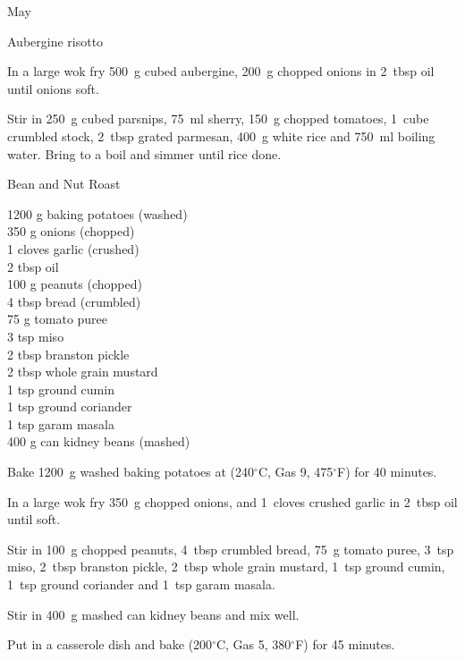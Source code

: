 \begin{menu}{May}
\begin{recipe}{2}{Aubergine risotto}
\begin{ingredients}
		\end{ingredients}
	
    \begin{instructions}
    \item 
        In a large wok fry
        500~g cubed aubergine,
        200~g chopped onions
        in
        2~tbsp  oil
        until onions soft.
      \item 
        Stir in
        250~g cubed parsnips,
        75~ml  sherry,
        150~g chopped tomatoes,
        1~cube crumbled stock,
        2~tbsp grated parmesan,
        400~g  white rice
        and
        750~ml  boiling water.
        Bring to a boil and simmer until rice done.
      
    \end{instructions}
    \end{recipe}%
  
    \begin{recipe}{2}{Bean and Nut Roast}%
		\begin{ingredients}
		1200 g baking potatoes (washed) \\
	350 g onions (chopped) \\
	1 cloves garlic (crushed) \\
	2 tbsp oil  \\
	100 g peanuts (chopped) \\
	4 tbsp bread (crumbled) \\
	75 g tomato puree  \\
	3 tsp miso  \\
	2 tbsp branston pickle  \\
	2 tbsp whole grain mustard  \\
	1 tsp ground cumin  \\
	1 tsp ground coriander  \\
	1 tsp garam masala  \\
	400 g can kidney beans (mashed) \\
	
		\end{ingredients}
	
    \begin{instructions}
    \item 
      Bake 
      1200~g washed baking potatoes
      at
      (240$^{\circ}$C, Gas 9, 475$^{\circ}$F) for 40 minutes.
    \item 
        In a large wok fry
        350~g chopped onions,
        and
        1~cloves crushed garlic
        in
        2~tbsp  oil
        until soft.
      \item 
        Stir in
        100~g chopped peanuts,
        4~tbsp crumbled bread,
        75~g  tomato puree,
        3~tsp  miso,
        2~tbsp  branston pickle,
        2~tbsp  whole grain mustard,
        1~tsp  ground cumin,
        1~tsp  ground coriander
        and
        1~tsp  garam masala.
      \item 
        Stir in
        400~g mashed can kidney beans
        and mix well.
      \item 
        Put in a casserole dish and
        bake (200$^{\circ}$C, Gas 5, 380$^{\circ}$F) for 45 minutes.
      

\end{instructions}
\end{recipe}
\end{menu}
